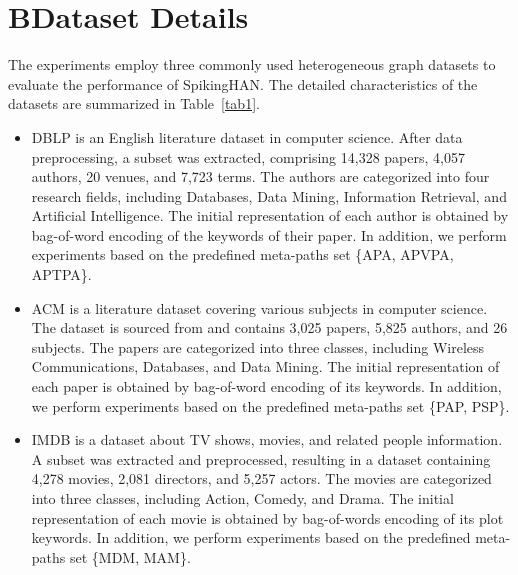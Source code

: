 \documentclass[letterpaper]{article} %
\begin{document}
\section{B\hspace{1em}Dataset Details}
The experiments employ three commonly used heterogeneous graph datasets to evaluate the performance of SpikingHAN. The detailed characteristics of the datasets are summarized in Table~\ref{tab1}. 
\begin{itemize}
    \item DBLP is an English literature dataset in computer science. After data preprocessing, a subset was extracted, comprising 14,328 papers, 4,057 authors, 20 venues, and 7,723 terms. The authors are categorized into four research fields, including Databases, Data Mining, Information Retrieval, and Artificial Intelligence. The initial representation of each author is obtained by bag-of-word encoding of the keywords of their paper. In addition, we perform experiments based on the predefined meta-paths set \{APA, APVPA, APTPA\}.
    \item ACM is a literature dataset covering various subjects in computer science. The dataset is sourced from \cite{bib10} and contains 3,025 papers, 5,825 authors, and 26 subjects. The papers are categorized into three classes, including Wireless Communications, Databases, and Data Mining. The initial representation of each paper is obtained by bag-of-word encoding of its keywords. In addition, we perform experiments based on the predefined meta-paths set \{PAP, PSP\}.
    \item IMDB is a dataset about TV shows, movies, and related people information. A subset was extracted and preprocessed, resulting in a dataset containing 4,278 movies, 2,081 directors, and 5,257 actors. The movies are categorized into three classes, including Action, Comedy, and Drama. The initial representation of each movie is obtained by bag-of-words encoding of its plot keywords. In addition, we perform experiments based on the predefined meta-paths set \{MDM, MAM\}.
\end{itemize}
\end{document}
